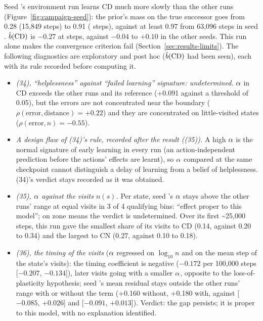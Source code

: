 \documentclass[10pt]{article}
\begin{document}
Seed \eThreeCampaignSeedA's environment run learns CD much more slowly than the other runs
(Figure~\ref{fig:campaign-seed}): the prior's mass on the true successor goes from 0.28 (15,849 steps) to 0.91 %
(\eThreeBudget{} steps), against at least 0.97 from 63,096 steps in seed \eThreeCampaignSeedB. $\hat{b}(\mathrm{CD})$ is %
$-0.27$ at \eThreeBudget{} steps, against $-0.04$ to $+0.10$ in the other seeds. This run alone makes the convergence %
criterion fail (Section~\ref{sec:results-limits}).
The following diagnostics are exploratory and post hoc ($\hat{b}(\mathrm{CD})$ had been seen), each with its rule
recorded before computing it.
{\sloppy
\begin{itemize}
  \item \emph{(34), ``helplessness'' against ``failed learning'' signature: undetermined.} $\alpha$ in CD exceeds the %
    other runs and its reference (+0.091 against a threshold of 0.05), but the errors are not concentrated near the %
    boundary ($\rho(\text{error}, \text{distance}) = +0.22$) and they are concentrated on little-visited states %
    ($\rho(\text{error}, n) = -0.55$). %
  \item \emph{A design flaw of (34)'s rule, recorded after the result ((35)).} A high $\alpha$ is the normal %
    signature of early learning in every run (an action-independent prediction before the actions' effects are
    learnt), so $\alpha$ compared at the same checkpoint cannot distinguish a delay of learning from a belief of
    helplessness. (34)'s verdict stays recorded as it was obtained. %
  \item \emph{(35), $\alpha$ against the visits $n(s)$.} Per state, seed \eThreeCampaignSeedA's $\alpha$ stays %
    above the other runs' range at equal visits in 3 of 4 qualifying bins: ``effect proper to this model''; on zone %
    means the verdict is undetermined. Over its first \textasciitilde25,000 steps, this run gave the smallest share of %
    its visits to CD (0.14, against 0.20 to 0.34) and the largest to CN (0.27, against 0.10 to 0.18). %
  \item \emph{(36), the timing of the visits} ($\alpha$ regressed on $\log_{10} n$ and on the mean step of the %
    state's visits): the timing coefficient is negative ($-0.172$ per 100,000 steps [$-0.207$, $-0.134$]), later visits %
    going with a smaller $\alpha$, opposite to the loss-of-plasticity hypothesis; seed \eThreeCampaignSeedA's mean
    residual stays outside the other runs' range with or without the term (+0.160 without, +0.180 with, against %
    [$-0.085$, $+0.026$] and [$-0.091$, $+0.013$]). Verdict: the gap persists; it is proper to this model, with no %
    explanation identified.
\end{itemize}
\par}
\end{document}
